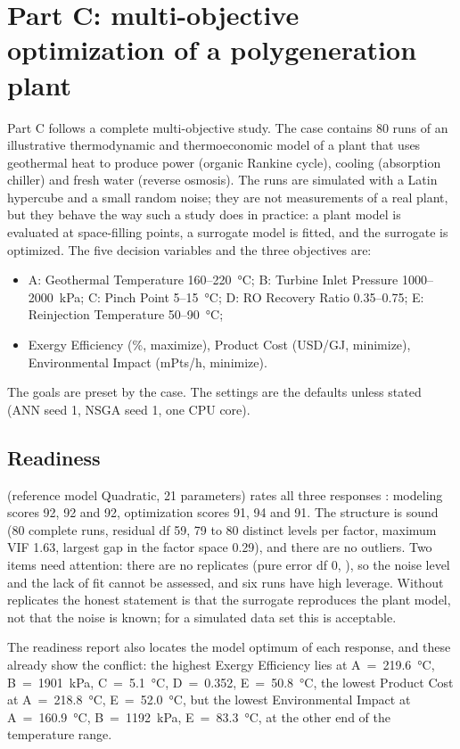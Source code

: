 \section{Part C: multi-objective optimization of a polygeneration plant}
\label{sec:ch11-polygen}
Part C follows a complete multi-objective study. The case  contains 80 runs of
an illustrative thermodynamic and thermoeconomic model of a plant that uses geothermal heat to produce power (organic
Rankine cycle), cooling (absorption chiller) and fresh water (reverse osmosis). The runs are simulated with a Latin
hypercube and a small random noise; they are not measurements of a real plant, but they behave the way such a study
does in practice: a plant model is evaluated at space-filling points, a surrogate model is fitted, and the surrogate
is optimized. The five decision variables and the three objectives are:
\begin{itemize}
  \item A: Geothermal Temperature 160--220~°C; B: Turbine Inlet Pressure 1000--2000~kPa; C: Pinch Point 5--15~°C;
        D: RO Recovery Ratio 0.35--0.75; E: Reinjection Temperature 50--90~°C;
  \item Exergy Efficiency (\%, maximize), Product Cost (USD/GJ, minimize), Environmental Impact (mPts/h, minimize).
\end{itemize}
The goals are preset by the case. The settings are the defaults unless stated (ANN seed 1, NSGA seed 1, one CPU core).

\subsection{Readiness}
 (reference model Quadratic, 21 parameters) rates all three responses : modeling scores 92,
92 and 92, optimization scores 91, 94 and 91. The structure is sound (80 complete runs, residual df 59, 79 to 80
distinct levels per factor, maximum VIF 1.63, largest gap in the factor space 0.29), and there are no outliers. Two
items need attention: there are no replicates (pure error df 0, ), so the noise level and the lack of fit
cannot be assessed, and six runs have high leverage. Without replicates the honest statement is that the surrogate
reproduces the plant model, not that the noise is known; for a simulated data set this is acceptable.

The readiness report also locates the model optimum of each response, and these already show the conflict: the
highest Exergy Efficiency lies at A~=~219.6~°C, B~=~1901~kPa, C~=~5.1~°C, D~=~0.352, E~=~50.8~°C, the lowest Product
Cost at A~=~218.8~°C, E~=~52.0~°C, but the lowest Environmental Impact at A~=~160.9~°C, B~=~1192~kPa, E~=~83.3~°C, at
the other end of the temperature range.

